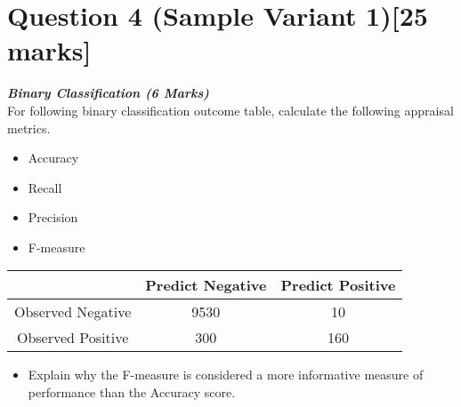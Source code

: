 \documentclass[]{article}
\begin{document}
\section*{Question 4 (Sample Variant 1)[25 marks]}



\item[(b)] \textbf{\textit{Binary Classification (6 Marks)}}\\
For following binary classification outcome table, calculate the following appraisal metrics.
\begin{itemize}	
\item 	Accuracy
\item 	Recall
\item 	Precision
\item  	F-measure
\end{itemize}	

\begin{center}
\begin{tabular}{|c|c|c|}
\hline  & \phantom{spa}Predict Negative\phantom{spa} & \phantom{spa}Predict Positive\phantom{spa} \\ 
\hline\phantom{spa} Observed Negative \phantom{spa}&	9530	&	10	\\ 
\hline \phantom{spa}Observed Positive\phantom{spa} & 	300	&	160	\\ 
\hline 
\end{tabular} 
\end{center}

\begin{itemize}	
\item   Explain why the F-measure is considered a more informative measure of performance than the Accuracy score.
\end{itemize}
\end{document}

